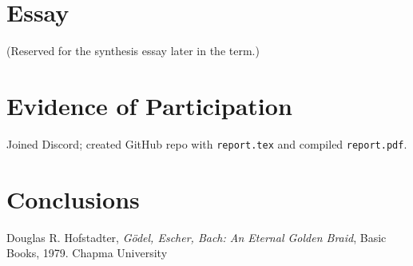 \documentclass{article}
\theoremstyle{theorem}
\theoremstyle{definition}
\theoremstyle{remark}
\begin{document}
\section{Essay}
(Reserved for the synthesis essay later in the term.)

\section{Evidence of Participation}
Joined Discord; created GitHub repo with \texttt{report.tex} and compiled \texttt{report.pdf}.

\section{Conclusions}\label{conclusion}

\begin{thebibliography}{99}
 Douglas R. Hofstadter, \emph{Gödel, Escher, Bach: An Eternal Golden Braid}, Basic Books, 1979. Chapma University
\end{thebibliography}
\end{document}
